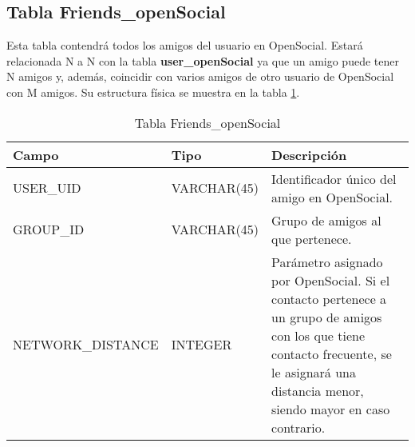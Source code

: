 \subsection{Tabla Friends\_openSocial}
Esta tabla contendrá todos los amigos del usuario en OpenSocial. Estará relacionada N a N con la tabla \textbf{user\_openSocial} ya que un amigo puede tener N amigos y, además, coincidir con varios amigos de otro usuario de OpenSocial con M amigos. Su estructura física se muestra en la tabla \ref{tabFriendsOpenSocial}.
\bigskip
\par
\begin{table}[h]
\begin{center}
\begin{tabular}{| l | l | p{60mm} |}\hline
\textbf{Campo}&\textbf{Tipo}&\textbf{Descripción} \\ \hline
USER\_UID & VARCHAR(45) & Identificador único del amigo en OpenSocial. \\ \hline
GROUP\_ID & VARCHAR(45) & Grupo de amigos al que pertenece. \\ \hline
NETWORK\_DISTANCE & INTEGER & Parámetro asignado por OpenSocial. Si el contacto pertenece a un grupo de amigos con los que tiene contacto frecuente, se le asignará una distancia menor, siendo mayor en caso contrario. \\ \hline
\end{tabular}
\end{center}
\caption{Tabla Friends\_openSocial} \label{tabFriendsOpenSocial}
\end{table}

